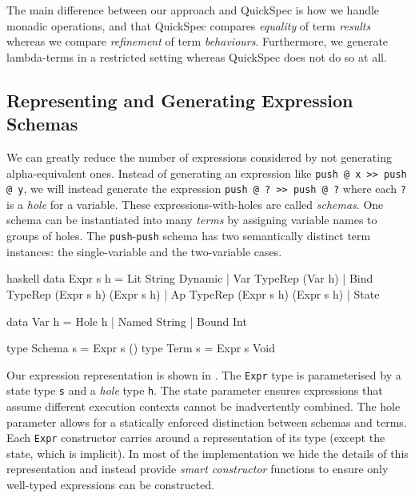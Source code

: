 The main difference between our approach and QuickSpec is how we
handle monadic operations, and that QuickSpec compares \emph{equality}
of term \emph{results} whereas we compare \emph{refinement} of term
\emph{behaviours}.  Furthermore, we generate lambda-terms in a
restricted setting whereas QuickSpec does not do so at all.

\subsection{Representing and Generating Expression Schemas}
\label{sec:coco-hiw-gen}

We can greatly reduce the number of expressions considered by not
generating alpha-equivalent ones.  Instead of generating an expression
like \verb|push @ x >> push @ y|, we will instead generate the
expression \verb|push @ ? >> push @ ?| where each \verb|?| is a
\emph{hole} for a variable.  These expressions-with-holes are called
\emph{schemas}.  One schema can be instantiated into many \emph{terms}
by assigning variable names to groups of holes.  The
\verb|push|-\verb|push| schema has two semantically distinct term
instances: the single-variable and the two-variable cases.

\begin{listing}
\centering
\begin{cminted}{haskell}
data Expr s h
  = Lit  String Dynamic
  | Var  TypeRep (Var h)
  | Bind TypeRep (Expr s h) (Expr s h)
  | Ap   TypeRep (Expr s h) (Expr s h)
  | State

data Var h = Hole h | Named String | Bound Int

type Schema s = Expr s ()
type Term   s = Expr s Void
\end{cminted}
\caption{Representation of Haskell expressions.}
\label{lst:exprrep}
\end{listing}

Our expression representation is shown in .  The
\verb|Expr| type is parameterised by a state type \verb|s| and a
\emph{hole} type \verb|h|.  The state parameter ensures expressions
that assume different execution contexts cannot be inadvertently
combined.  The hole parameter allows for a statically enforced
distinction between schemas and terms.  Each \verb|Expr| constructor
carries around a representation of its type (except the state, which
is implicit).  In most of the implementation we hide the details of
this representation and instead provide \emph{smart constructor}
functions to ensure only well-typed expressions can be constructed.

